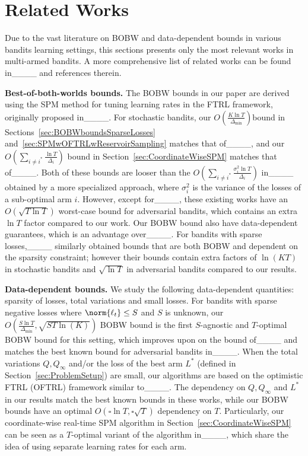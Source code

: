 \section{Related Works}
\label{sec:RelatedWorks}
Due to the vast literature on BOBW and data-dependent bounds in various bandits learning settings, this sections presents only the most relevant works in multi-armed bandits.
A more comprehensive list of related works can be found in____ and references therein.

\textbf{Best-of-both-worlds bounds.} The BOBW bounds in our paper are derived using the SPM method for tuning learning rates in the FTRL framework, originally proposed in____. For stochastic bandits, our $O(\frac{K\ln{T}}{\Delta_{\min}})$bound  in Sections~\ref{sec:BOBWboundsSparseLosses} and~\ref{sec:SPMwOFTRLwReservoirSampling} matches that of____, and our $O(\sum_{i \neq i^*}\frac{\ln{T}}{\Delta_i})$ bound in Section~\ref{sec:CoordinateWiseSPM} matches that of____. 
Both of these bounds are looser than the $O(\sum_{i \neq i^*}\frac{\sigma_i^2 \ln{T}}{\Delta_i})$ in____ obtained by a more specialized approach, where $\sigma_i^2$ is the variance of the losses of a sub-optimal arm $i$.
However, except for____, these existing works have an $O(\sqrt{T\ln{T}})$ worst-case bound for adversarial bandits, which contains an extra $\ln{T}$ factor compared to our work. 
Our BOBW bound also have data-dependent guarantees, which is an advantage over____. 
For bandits with sparse losses,____ similarly obtained bounds that are both BOBW and dependent on the sparsity constraint; however their bounds contain extra factors of $\ln(KT)$ in stochastic bandits and $\sqrt{\ln{T}}$ in adversarial bandits compared to our results.

\textbf{Data-dependent bounds.} We study the following data-dependent quantities: sparsity of losses, total variations and small losses. 
For bandits with sparse negative losses where $\norm{\ell_t} \leq S$ and $S$ is unknown, our $O(\frac{S\ln{T}}{\Delta_{\min}}, \sqrt{ST\ln(K)})$ BOBW bound is the first $S$-agnostic and $T$-optimal BOBW bound for this setting, which improves upon on the bound of____ and matches the best known bound for adversarial bandits in____.
When the total variations $Q, Q_\infty$ and/or the loss of the best arm $L^*$ (defined in Section~\ref{sec:ProblemSetup}) are small, our algorithms are based on the optimistic FTRL (OFTRL) framework similar to____. 
The dependency on $Q, Q_\infty$ and $L^*$ in our results match the best known bounds in these works, while our BOBW bounds have an optimal $O(\square\ln{T}, \square\sqrt{T})$ dependency on $T$. 
Particularly, our coordinate-wise real-time SPM algorithm in Section~\ref{sec:CoordinateWiseSPM} can be seen as a $T$-optimal variant of the algorithm in____, which share the idea of using separate learning rates for each arm.


